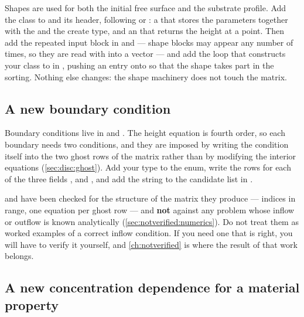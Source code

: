 Shapes are used for both the initial free surface and the substrate profile.
Add the class to 
and its header, following  or : a
 that stores the parameters together with the  and the
create type, and an  that returns the height at a
point. Then add the repeated input block in  and
 --- shape blocks may appear any number of times, so they are
read with  into a vector --- and add the loop that
constructs your class to  in
, pushing an entry onto
 so that the shape takes part in the  sorting.
Nothing else changes: the shape machinery does not touch the matrix.

\subsection{A new boundary condition}

Boundary conditions live in  and
. The height equation is fourth order, so each boundary needs two
conditions, and they are imposed by writing the condition itself into the two
ghost rows of the matrix rather than by modifying the interior equations
(\cref{sec:disc:ghost}). Add your type to the  enum,
write the rows for each of the three fields ,
 and , and add the string to the candidate list
in .

\begin{warn}
   and  have been checked for the structure of
  the matrix they produce --- indices in range, one equation per ghost row ---
  and \textbf{not} against any problem whose inflow or outflow is known
  analytically (\cref{sec:notverified:numerics}). Do not treat them as
  worked examples of a correct inflow condition. If you need one that is right,
  you will have to verify it yourself, and \cref{ch:notverified} is where the
  result of that work belongs.
\end{warn}

\subsection{A new concentration dependence for a material property}

